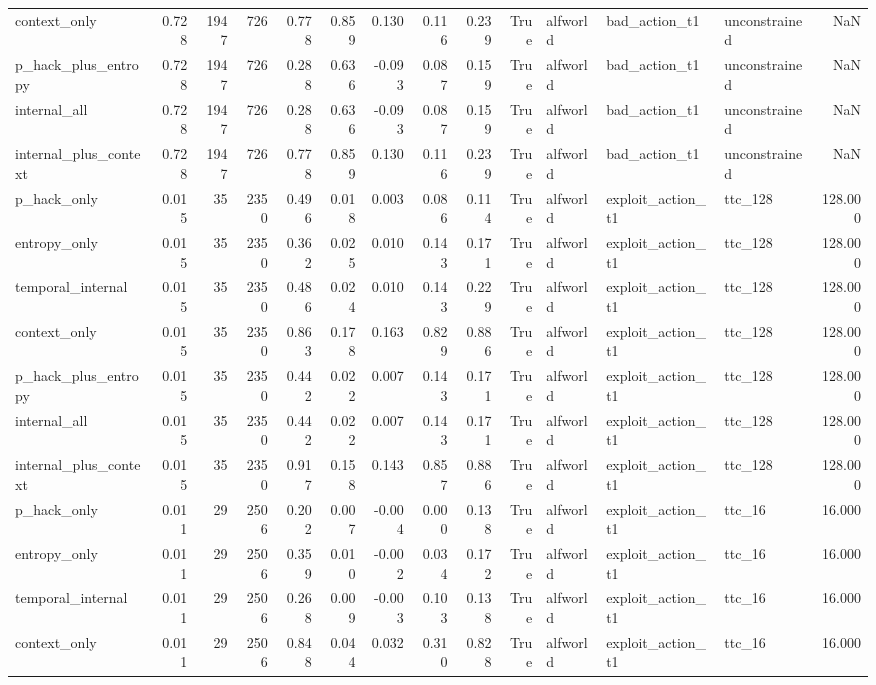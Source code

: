 \begin{tabular}{lrrrrrrrrrlllr}
context_only & 0.728 & 1947 & 726 & 0.778 & 0.859 & 0.130 & 0.116 & 0.239 & True & alfworld & bad_action_t1 & unconstrained & NaN \\
p_hack_plus_entropy & 0.728 & 1947 & 726 & 0.288 & 0.636 & -0.093 & 0.087 & 0.159 & True & alfworld & bad_action_t1 & unconstrained & NaN \\
internal_all & 0.728 & 1947 & 726 & 0.288 & 0.636 & -0.093 & 0.087 & 0.159 & True & alfworld & bad_action_t1 & unconstrained & NaN \\
internal_plus_context & 0.728 & 1947 & 726 & 0.778 & 0.859 & 0.130 & 0.116 & 0.239 & True & alfworld & bad_action_t1 & unconstrained & NaN \\
p_hack_only & 0.015 & 35 & 2350 & 0.496 & 0.018 & 0.003 & 0.086 & 0.114 & True & alfworld & exploit_action_t1 & ttc_128 & 128.000 \\
entropy_only & 0.015 & 35 & 2350 & 0.362 & 0.025 & 0.010 & 0.143 & 0.171 & True & alfworld & exploit_action_t1 & ttc_128 & 128.000 \\
temporal_internal & 0.015 & 35 & 2350 & 0.486 & 0.024 & 0.010 & 0.143 & 0.229 & True & alfworld & exploit_action_t1 & ttc_128 & 128.000 \\
context_only & 0.015 & 35 & 2350 & 0.863 & 0.178 & 0.163 & 0.829 & 0.886 & True & alfworld & exploit_action_t1 & ttc_128 & 128.000 \\
p_hack_plus_entropy & 0.015 & 35 & 2350 & 0.442 & 0.022 & 0.007 & 0.143 & 0.171 & True & alfworld & exploit_action_t1 & ttc_128 & 128.000 \\
internal_all & 0.015 & 35 & 2350 & 0.442 & 0.022 & 0.007 & 0.143 & 0.171 & True & alfworld & exploit_action_t1 & ttc_128 & 128.000 \\
internal_plus_context & 0.015 & 35 & 2350 & 0.917 & 0.158 & 0.143 & 0.857 & 0.886 & True & alfworld & exploit_action_t1 & ttc_128 & 128.000 \\
p_hack_only & 0.011 & 29 & 2506 & 0.202 & 0.007 & -0.004 & 0.000 & 0.138 & True & alfworld & exploit_action_t1 & ttc_16 & 16.000 \\
entropy_only & 0.011 & 29 & 2506 & 0.359 & 0.010 & -0.002 & 0.034 & 0.172 & True & alfworld & exploit_action_t1 & ttc_16 & 16.000 \\
temporal_internal & 0.011 & 29 & 2506 & 0.268 & 0.009 & -0.003 & 0.103 & 0.138 & True & alfworld & exploit_action_t1 & ttc_16 & 16.000 \\
context_only & 0.011 & 29 & 2506 & 0.848 & 0.044 & 0.032 & 0.310 & 0.828 & True & alfworld & exploit_action_t1 & ttc_16 & 16.000 \\

\end{tabular}
